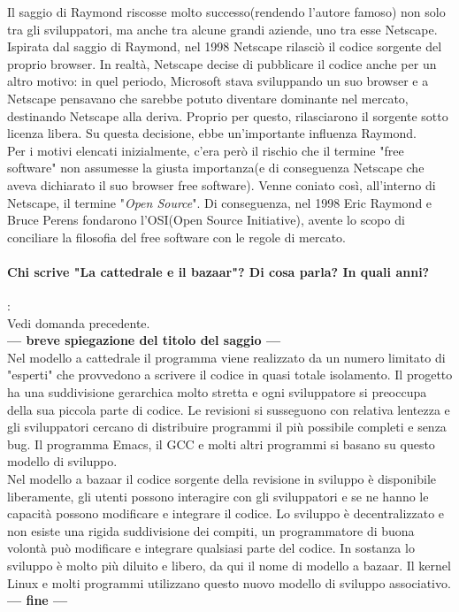 \documentclass[a4paper]{article}
\begin{document}
		Il saggio di Raymond riscosse molto successo(rendendo l'autore famoso) non solo tra gli sviluppatori, ma anche tra alcune grandi aziende, uno tra esse Netscape.
		Ispirata dal saggio di Raymond, nel 1998 Netscape rilasciò il codice sorgente del proprio browser.
		In realtà, Netscape decise di pubblicare il codice anche per un altro motivo: in quel periodo, Microsoft stava sviluppando un suo browser e a Netscape pensavano che sarebbe potuto diventare dominante nel mercato, destinando Netscape alla deriva. Proprio per questo, rilasciarono il sorgente sotto licenza libera. Su questa decisione, ebbe un'importante influenza Raymond. \\
		Per i motivi elencati inizialmente, c'era però il rischio che il termine "free software" non assumesse la giusta importanza(e di conseguenza Netscape che aveva dichiarato il suo browser free software). Venne coniato così, all'interno di Netscape, il termine "\textit{Open Source}". Di conseguenza, nel 1998 Eric Raymond e Bruce Perens fondarono l'OSI(Open Source Initiative), avente lo scopo di conciliare la filosofia del free software con le regole di mercato.
		
		
		\paragraph{Chi scrive "La cattedrale e il bazaar"? Di cosa parla? In quali anni?}: \\
		Vedi domanda precedente. \\
		\textbf{--- breve spiegazione del titolo del saggio ---} \\
		Nel modello a cattedrale il programma viene realizzato da un numero limitato di "esperti" che provvedono a scrivere il codice in quasi totale isolamento. Il progetto ha una suddivisione gerarchica molto stretta e ogni sviluppatore si preoccupa della sua piccola parte di codice. Le revisioni si susseguono con relativa lentezza e gli sviluppatori cercano di distribuire programmi il più possibile completi e senza bug. Il programma Emacs, il GCC e molti altri programmi si basano su questo modello di sviluppo.\\
		Nel modello a bazaar il codice sorgente della revisione in sviluppo è disponibile liberamente, gli utenti possono interagire con gli sviluppatori e se ne hanno le capacità possono modificare e integrare il codice. Lo sviluppo è decentralizzato e non esiste una rigida suddivisione dei compiti, un programmatore di buona volontà può modificare e integrare qualsiasi parte del codice. In sostanza lo sviluppo è molto più diluito e libero, da qui il nome di modello a bazaar. Il kernel Linux e molti programmi utilizzano questo nuovo modello di sviluppo associativo.
		\\
		\textbf{--- fine ---}
		
\end{document}
